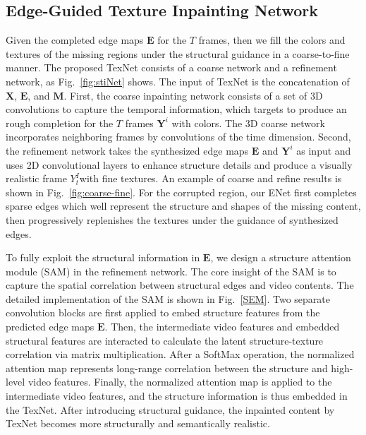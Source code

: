 \subsection{Edge-Guided Texture Inpainting Network}


Given the completed edge maps $\boldsymbol{E}$ for the 
$T$ frames, then we fill the colors and textures of the missing regions under the structural guidance in a coarse-to-fine manner. 
%
The proposed TexNet consists of a coarse network and a refinement network, as Fig.~\ref{fig:stiNet} shows.
%
The input of TexNet is the concatenation of $\boldsymbol{X}$, $\boldsymbol{E}$, and $\boldsymbol{M}$.
First, the coarse inpainting network consists of a set of 3D convolutions to capture the temporal information, which targets to produce an rough completion for the $T$ frames  $\boldsymbol{Y}^i$ with colors.
The 3D coarse network incorporates neighboring frames by convolutions of the time dimension.
%
Second, the refinement network takes the synthesized edge maps $\boldsymbol{E}$ and $\boldsymbol{Y}^i$ as input and uses 2D convolutional layers to enhance structure details and produce a visually realistic frame $Y^I_t$with fine textures. 
An example of coarse and refine results is shown in Fig.~\ref{fig:coarse-fine}. 
For the corrupted region, our ENet first completes sparse edges which well represent the structure and shapes of the missing content, then progressively replenishes the textures under the guidance of synthesized edges.



To fully exploit the structural information in $\boldsymbol{E}$, we design a structure attention module (SAM) in the refinement network.
The core insight of the SAM is to capture the spatial correlation between structural edges and video contents.
The detailed implementation of the SAM is shown in Fig.~\ref{SEM}.
Two separate convolution blocks are first applied to embed structure features from the predicted edge maps $\boldsymbol{E}$.
Then, the intermediate video features and embedded structural features are interacted to calculate the latent structure-texture correlation via matrix multiplication. 
After a SoftMax operation, the normalized attention map represents long-range correlation between the structure and high-level video features.
%
Finally, the normalized attention map is applied to the intermediate video features, and the structure information is thus embedded in the TexNet.
After introducing structural guidance, the inpainted content by TexNet becomes more structurally and semantically realistic.
 


